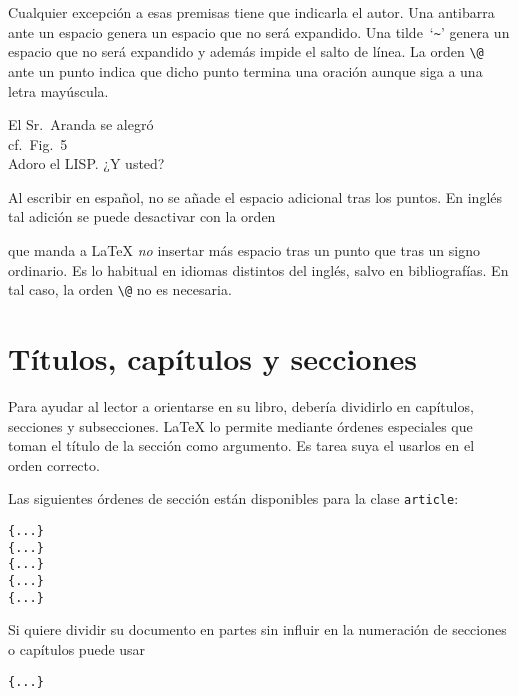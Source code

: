 Cualquier excepción a esas premisas tiene que indicarla el autor.  Una antibarra ante un espacio genera un espacio que no será expandido. Una tilde~`\verb|~|' genera un espacio que no será expandido y además impide el salto de línea.  La orden \verb|\@| ante un punto indica que dicho punto termina una oración aunque siga a una letra mayúscula.    

\begin{example}
El Sr.~Aranda se alegró\\
cf.~Fig.~5\\
Adoro el LISP\@. ¿Y usted?
\end{example}

Al escribir en español, no se añade el espacio adicional tras los puntos.  En inglés tal adición se puede desactivar con la orden 
\begin{lscommand}
\end{lscommand}
que manda a \LaTeX{} \emph{no} insertar más espacio tras un punto que tras un signo ordinario.  Es lo habitual en idiomas distintos del inglés, salvo en bibliografías.  En tal caso, la orden \verb|\@| no es necesaria.

\section{Títulos, capítulos y secciones}

Para ayudar al lector a orientarse en su libro, debería dividirlo en capítulos, secciones y subsecciones.  \LaTeX{} lo permite mediante órdenes especiales que toman el título de la sección como argumento. Es tarea suya el usarlos en el orden correcto.

Las siguientes órdenes de sección están disponibles para la clase \texttt{article}: \nopagebreak

\begin{lscommand}
\verb|{...}|\\
\verb|{...}|\\
\verb|{...}|\\
\verb|{...}|\\
\verb|{...}|
\end{lscommand}

Si quiere dividir su documento en partes sin influir en la numeración de secciones o capítulos puede usar
\begin{lscommand}
\verb|{...}|
\end{lscommand}

